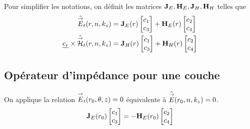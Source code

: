     Pour simplifier les notations, on définit les matrices $\mathbf{J}_{E},\mathbf{H}_{E},\mathbf{J}_{H},\mathbf{H}_{H}$ telles que
    \begin{align}
        \hat {{\overset{\rightarrow}{E}}}_t(r,n,k_z) &= \mathbf{J}_{E}(r)
        \begin{bmatrix}
            c_1 \\
            c_3
        \end{bmatrix}
        +
        \mathbf{H}_{E}(r)
        \begin{bmatrix}
            c_2 \\
            c_4
        \end{bmatrix}
        \\
        \underline{e_r}\times\hat {{\overset{\rightarrow}{\mathcal{H}}}}_t(r,n,k_z) &= 
        \mathbf{J}_{H}(r)
        \begin{bmatrix}
            c_1 \\
            c_3
        \end{bmatrix}
        +
        \mathbf{H}_{H}(r)
        \begin{bmatrix}
            c_2 \\
            c_4
        \end{bmatrix}
    \end{align}




    \subsection{Opérateur d'impédance pour une couche}

        On applique la relation ${\overset{\rightarrow}{E}}_t(r_0,\theta,z) = 0$ équivalente à $\hat {{\overset{\rightarrow}{E}}}(r_0,n,k_z) = 0$.
        \begin{equation}
            \mathbf{J}_{E}(r_0)
            \begin{bmatrix}
                c_1 \\
                c_3
            \end{bmatrix}
            =-\mathbf{H}_{E}(r_0)
            \begin{bmatrix}
                c_2 \\
                c_4
            \end{bmatrix}
        \end{equation}

